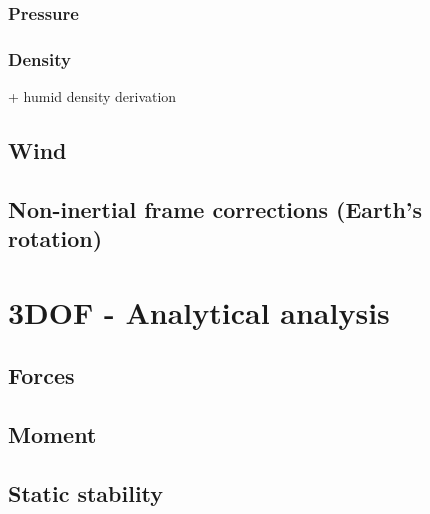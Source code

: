 \documentclass[10pt]{extarticle}
\numberwithin{equation}{subsection}
\begin{document}
\subsubsection{Pressure}
\subsubsection{Density}
+ humid density derivation

\subsection{Wind}

\subsection{Non-inertial frame corrections (Earth’s rotation)}



\newpage
\section{3DOF - Analytical analysis}
\subsection{Forces}
\subsection{Moment}
\subsection{Static stability}
\end{document}
